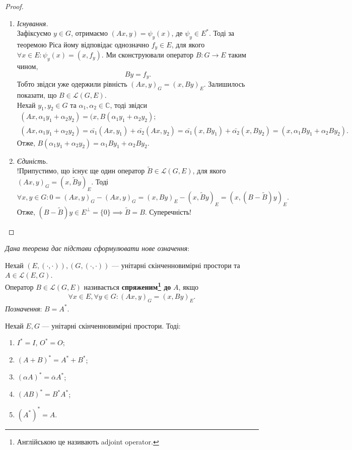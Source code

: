 \documentclass{math_library}
\begin{document}
\begin{proof}
\begin{enumerate}[topsep=0pt,wide=0pt,label={\Roman*.}]
\item \textit{Існування.}\\
Зафіксуємо $y \in G$, отримаємо $(Ax,y) = \psi_y(x)$, де $\psi_y \in E^*$. Тоді за теоремою Ріса йому відповідає однозначно $f_y \in E$, для якого $\forall x \in E: \psi_y(x) = (x,f_y)$. Ми сконструювали оператор $B \colon G \to E$ таким чином,
\[ 
By = f_y.
\] 
Тобто звідси уже одержили рівність $(Ax,y)_G = (x,By)_E$. Залишилось показати, що $B \in \mathcal{L}(G,E)$.\\
Нехай $y_1,y_2 \in G$ та $\alpha_1,\alpha_2 \in \mathbb{C}$, тоді звідси
\begin{align*}
(Ax,\alpha_1 y_1 + \alpha_2 y_2) = (x,B(\alpha_1 y_1 + \alpha_2 y_2);\\
(Ax,\alpha_1 y_1 + \alpha_2 y_2) = \bar{\alpha_1} (Ax,y_1) + \bar{\alpha_2} (Ax,y_2) = \bar{\alpha_1} (x,By_1) + \bar{\alpha_2} (x,By_2) = (x,\alpha_1 By_1 + \alpha_2 By_2).
\end{align*}
Отже, $B(\alpha_1 y_1 + \alpha_2 y_2) = \alpha_1 By_1 + \alpha_2 By_2$.

\item \textit{Єдиність.}\\
!Припустимо, що існує ще один оператор $\widetilde{B} \in \mathcal{L}(G,E)$, для якого $(Ax,y)_G = (x,\widetilde{B}y)_E$. Тоді
\[
\forall x,y \in G: 0 = (Ax,y)_G - (Ax,y)_G = (x,By)_E - (x,\widetilde{B}y)_E = (x,(B-\widetilde{B})y)_E.
\]
Отже, $(B-\widetilde{B})y \in E^\perp = \{0\} \implies \widetilde{B} = B$. Суперечність! \qedhere
\end{enumerate}
\end{proof}
\noindent \textit{Дана теорема дає підстави сформулювати нове означення}:

\begin{definition}
Нехай $(E,(\cdot,\cdot)), (G,(\cdot,\cdot))$ --- унітарні скінченновимірні простори та $A \in \mathcal{L}(E,G)$.\\
Оператор $B \in \mathcal{L}(G,E)$ називається \textbf{спряженим\footnote{Англійською це називають adjoint operator.} до} $A$, якщо
\begin{align*}
\forall x \in E, \forall y \in G: (Ax,y)_G = (x,By)_E.
\end{align*}
\textit{Позначення}: $B = A^*$.
\end{definition}

\begin{proposition}
Нехай $E,G$ --- унітарні скінченновимірні простори. Тоді:
\begin{enumerate}[nosep,wide=0pt,label={\arabic*)},start=0]
\item $I^* = I$, \qquad $O^* = O$;
\item $(A+B)^* = A^* + B^*$;
\item $(\alpha A)^* = \overline{\alpha} A^*$;
\item $(AB)^* = B^* A^*$;

\item $(A^*)^* = A$.
\end{enumerate}
\end{proposition}
\end{document}
